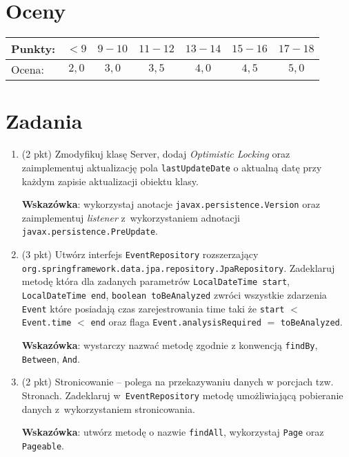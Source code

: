 \documentclass[12pt]{article}
\begin{document}
    \section*{Oceny}
    \begin{tabular}{|l|c|c|c|c|c|c|}
        \hline
        Punkty: & $<9$ & $9-10$ & $11-12$ & $13-14$ & $15-16$ & $17-18$\\
        \hline
        Ocena:  & $2,0$ & $3,0$ & $3,5$ & $4,0$ & $4,5$ & $5,0$\\
        \hline
    \end{tabular}

    \section*{Zadania}
    \begin{enumerate}
        \item
            (2 pkt) Zmodyfikuj klasę Server, dodaj \emph{Optimistic Locking} oraz zaimplementuj aktualizację pola \texttt{lastUpdateDate} o aktualną datę przy każdym zapisie aktualizacji obiektu klasy.

            \textbf{Wskazówka}: wykorzystaj anotacje \texttt{javax.persistence.Version} oraz zaimplementuj \emph{listener} z~wykorzystaniem  adnotacji \texttt{javax.persistence.PreUpdate}.

        \item
            (3 pkt) Utwórz interfejs \texttt{EventRepository} rozszerzający \texttt{org\allowbreak .spring\-frame\-work\allowbreak .data\allowbreak .jpa\allowbreak .re\-po\-si\-to\-ry.Jpa\-Repo\-si\-tory}. Zadeklaruj metodę która dla zadanych parametrów \texttt{Local\-Date\-Time start}, \texttt{Local\-Date\-Time end}, \texttt{boolean toBeAnalyzed} zwróci wszystkie zdarzenia \texttt{Event} które posiadają czas zarejestrowania time taki że \texttt{start} $<$ \texttt{Event.time} $<$ \texttt{end} oraz flaga \texttt{Event.analysisRequired} $=$ \texttt{toBeAnalyzed}.

            \textbf{Wskazówka}: wystarczy nazwać metodę zgodnie z konwencją \texttt{findBy}, \texttt{Between}, \texttt{And}.

        \item
            (2 pkt) Stronicowanie – polega na przekazywaniu danych w porcjach tzw. Stronach. Zadeklaruj w~\texttt{EventRepository} metodę umożliwiającą pobieranie danych z~wykorzystaniem stronicowania.

            \textbf{Wskazówka}: utwórz metodę o nazwie \texttt{findAll}, wykorzystaj \texttt{Page} oraz \texttt{Pageable}.


\end{enumerate}
\end{document}
